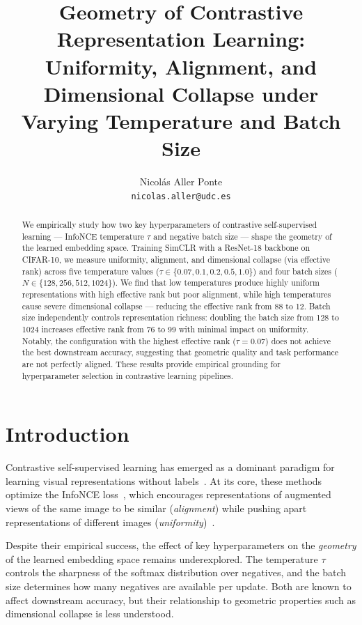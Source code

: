 \documentclass{article}
\title{Geometry of Contrastive Representation Learning:\\
Uniformity, Alignment, and Dimensional Collapse under\\
Varying Temperature and Batch Size}
\author{
  Nicolás Aller Ponte \\
  \texttt{nicolas.aller@udc.es}
}
\begin{document}
\maketitle

\begin{abstract}
We empirically study how two key hyperparameters of contrastive self-supervised 
learning --- InfoNCE temperature $\tau$ and negative batch size --- shape the 
geometry of the learned embedding space. Training SimCLR with a ResNet-18 backbone 
on CIFAR-10, we measure uniformity, alignment, and dimensional collapse (via 
effective rank) across five temperature values ($\tau \in \{0.07, 0.1, 0.2, 0.5, 
1.0\}$) and four batch sizes ($N \in \{128, 256, 512, 1024\}$). We find that low 
temperatures produce highly uniform representations with high effective rank but 
poor alignment, while high temperatures cause severe dimensional collapse --- 
reducing the effective rank from 88 to 12. Batch size independently controls 
representation richness: doubling the batch size from 128 to 1024 increases 
effective rank from 76 to 99 with minimal impact on uniformity. Notably, the 
configuration with the highest effective rank ($\tau=0.07$) does not achieve the 
best downstream accuracy, suggesting that geometric quality and task performance 
are not perfectly aligned. These results provide empirical grounding for 
hyperparameter selection in contrastive learning pipelines.
\end{abstract}

\section{Introduction}

Contrastive self-supervised learning has emerged as a dominant paradigm for 
learning visual representations without labels~\cite{chen2020simple}. At its 
core, these methods optimize the InfoNCE loss~\cite{chen2020simple}, which 
encourages representations of augmented views of the same image to be similar 
(\emph{alignment}) while pushing apart representations of different images 
(\emph{uniformity})~\cite{wang2020understanding}.

Despite their empirical success, the effect of key hyperparameters on the 
\emph{geometry} of the learned embedding space remains underexplored. The 
temperature $\tau$ controls the sharpness of the softmax distribution over 
negatives, and the batch size determines how many negatives are available per 
update. Both are known to affect downstream accuracy, but their relationship 
to geometric properties such as dimensional collapse is less understood.
\end{document}
